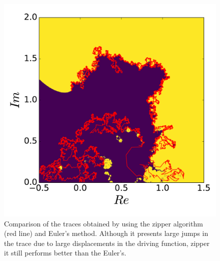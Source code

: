 \begin{figure}
\begin{center}
    \includegraphics[scale=0.5]{chapters/ch4-sle/figs/eulerzip}
\end{center}
\caption{Comparison of the traces obtained by using the zipper algorithm (red
    line) and Euler's method. Although it presents large jumps in the trace due
    to large displacements in the driving function, zipper it still performs
    better than the Euler's.}
\label{fig:eulerzip}
\end{figure}
